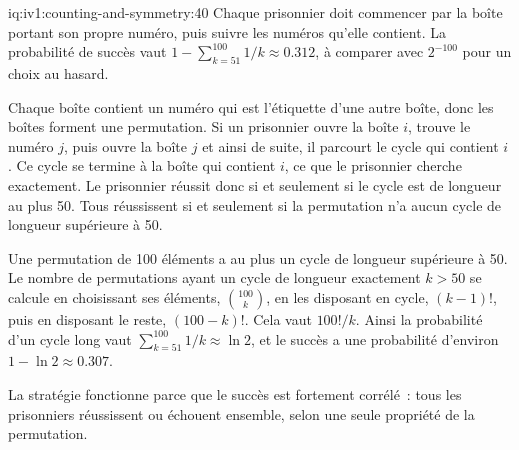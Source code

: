 \begin{solution}{iq:iv1:counting-and-symmetry:40}
Chaque prisonnier doit commencer par la boîte portant son propre numéro, puis suivre les numéros qu'elle contient. La probabilité de succès vaut $1 - \sum_{k=51}^{100} 1/k \approx 0.312$, à comparer avec $2^{-100}$ pour un choix au hasard.

Chaque boîte contient un numéro qui est l'étiquette d'une autre boîte, donc les boîtes forment une permutation. Si un prisonnier ouvre la boîte $i$, trouve le numéro $j$, puis ouvre la boîte $j$ et ainsi de suite, il parcourt le cycle qui contient $i$. Ce cycle se termine à la boîte qui contient $i$, ce que le prisonnier cherche exactement. Le prisonnier réussit donc si et seulement si le cycle est de longueur au plus 50. Tous réussissent si et seulement si la permutation n'a aucun cycle de longueur supérieure à 50.

Une permutation de 100 éléments a au plus un cycle de longueur supérieure à 50. Le nombre de permutations ayant un cycle de longueur exactement $k > 50$ se calcule en choisissant ses éléments, $\binom{100}{k}$, en les disposant en cycle, $(k - 1)!$, puis en disposant le reste, $(100 - k)!$. Cela vaut $100!/k$. Ainsi la probabilité d'un cycle long vaut $\sum_{k=51}^{100} 1/k \approx \ln 2$, et le succès a une probabilité d'environ $1 - \ln 2 \approx 0.307$.

La stratégie fonctionne parce que le succès est fortement corrélé~: tous les prisonniers réussissent ou échouent ensemble, selon une seule propriété de la permutation.

\end{solution}
